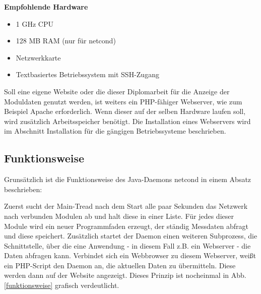 \documentclass[a4paper,14pt,headsepline]{scrartcl}
\begin{document}
\textbf{Empfohlende Hardware}

\begin{itemize}
	\item 1 GHz CPU
	\item 128 MB RAM (nur für netcond)
	\item Netzwerkkarte
	\item Textbasiertes Betriebssystem mit SSH-Zugang
\end{itemize}

Soll eine eigene Website oder die dieser Diplomarbeit für die Anzeige der Moduldaten genutzt werden, ist weiters ein PHP-fähiger Webserver, wie zum Beispiel Apache erforderlich. Wenn dieser auf der selben Hardware laufen soll, wird zusätzlich Arbeitsspeicher benötigt. Die Installation eines Webservers wird im Abschnitt Installation für die gängigen Betriebssysteme beschrieben. 

\newpage

\subsection{Funktionsweise}

Grunsätzlich ist die Funktionsweise des Java-Daemons netcond in einem Absatz beschrieben:

Zuerst sucht der Main-Tread nach dem Start alle paar Sekunden das Netzwerk nach verbunden Modulen ab und halt diese in einer Liste. Für jedes dieser Module wird ein neuer Programmfaden erzeugt, der ständig Messdaten abfragt und diese speichert. Zusätzlich startet der Daemon einen weiteren Subprozess, die Schnittstelle, über die eine Anwendung - in diesem Fall z.B. ein Webserver - die Daten abfragen kann. Verbindet sich ein Webbrowser zu diesem Webserver, weißt ein PHP-Script den Daemon an, die aktuellen Daten zu übermitteln. Diese werden dann auf der Website angezeigt. Dieses Prinzip ist nocheinmal in Abb. \ref{funktionsweise} grafisch verdeutlicht.
\end{document}
